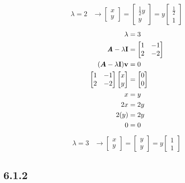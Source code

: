 \documentclass{article}
\begin{document}
\begin{align*}
	\lambda = 2 & \rightarrow \begin{bmatrix} x \\ y \end{bmatrix} = \begin{bmatrix} \frac{1}{2}y \\ y \end{bmatrix} = y \begin{bmatrix} \frac{1}{2} \\ 1 \end{bmatrix}
\end{align*}
\begin{align*}
	\lambda & = 3 \\
	\matr{A} - \lambda \vect{I} & =
		\begin{bmatrix}
			1 & -1 \\
			2 & -2
		\end{bmatrix} \\
	(\matr{A} - \lambda \vect{I})\vect{v} & = 0 \\
	\begin{bmatrix} 1 & -1 \\ 2 & -2 \end{bmatrix}
	\begin{bmatrix} x \\ y \end{bmatrix} & =
	\begin{bmatrix} 0 \\ 0 \end{bmatrix} \\
	x & = y \\
	2x & = 2y \\
	2(y) & = 2y \\
	0 & = 0
\end{align*}
\begin{align*}
	\lambda = 3 & \rightarrow \begin{bmatrix} x \\ y \end{bmatrix} = \begin{bmatrix} y \\ y \end{bmatrix} = y \begin{bmatrix} 1 \\ 1 \end{bmatrix}
\end{align*}

\subsection{6.1.2}
\end{document}
